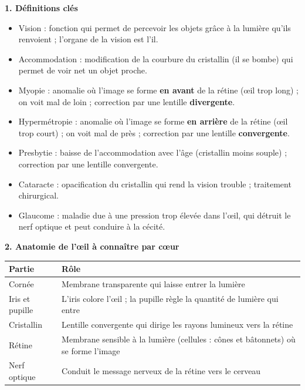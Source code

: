 \documentclass[11pt]{article}
\newcommand{\cle}[1]{{\popxbold\color{popdark}#1}}
\begin{document}
\begin{bilan}
\textbf{1. Définitions clés}
\begin{itemize}
\item \cle{Vision} : fonction qui permet de percevoir les objets grâce à la lumière qu'ils renvoient ; l'organe de la vision est l'\cle{{\oe}il}.
\item \cle{Accommodation} : modification de la courbure du cristallin (il se bombe) qui permet de voir net un objet proche.
\item \cle{Myopie} : anomalie où l'image se forme \textbf{en avant} de la rétine ({\oe}il trop long) ; on voit mal de loin ; correction par une lentille \textbf{divergente}.
\item \cle{Hypermétropie} : anomalie où l'image se forme \textbf{en arrière} de la rétine ({\oe}il trop court) ; on voit mal de près ; correction par une lentille \textbf{convergente}.
\item \cle{Presbytie} : baisse de l'accommodation avec l'âge (cristallin moins souple) ; correction par une lentille convergente.
\item \cle{Cataracte} : opacification du cristallin qui rend la vision trouble ; traitement chirurgical.
\item \cle{Glaucome} : maladie due à une pression trop élevée dans l'{\oe}il, qui détruit le nerf optique et peut conduire à la cécité.
\end{itemize}

\textbf{2. Anatomie de l'{\oe}il à connaître par c{\oe}ur}
\begin{center}
\begin{tabularx}{\linewidth}{|l|X|}\hline
\rowcolor{popblueL} \textbf{Partie} & \textbf{Rôle} \\ \hline
Cornée & Membrane transparente qui laisse entrer la lumière \\ \hline
Iris et pupille & L'iris colore l'{\oe}il ; la pupille règle la quantité de lumière qui entre \\ \hline
Cristallin & Lentille convergente qui dirige les rayons lumineux vers la rétine \\ \hline
Rétine & Membrane sensible à la lumière (cellules : cônes et bâtonnets) où se forme l'image \\ \hline
Nerf optique & Conduit le message nerveux de la rétine vers le cerveau \\ \hline
\end{tabularx}
\end{center}


\end{bilan}
\end{document}
